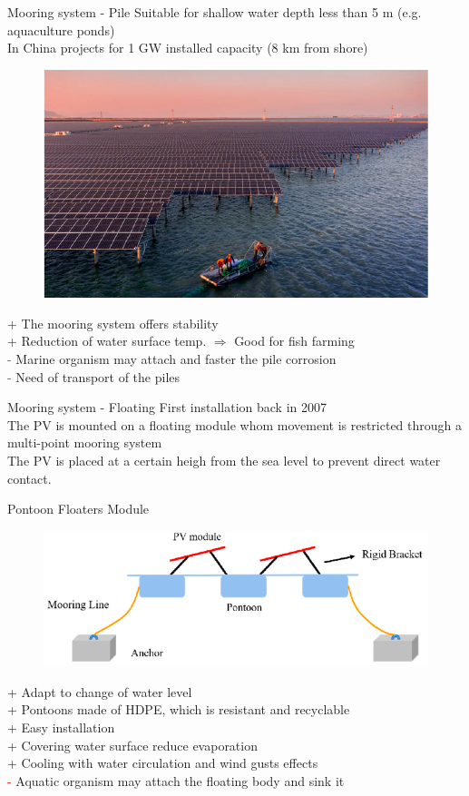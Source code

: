 \documentclass[aspectratio=169, 12pt]{beamer}
\begin{document}
\begin{frame}{Mooring system - Pile}
  Suitable for shallow water depth less than 5 m (e.g. aquaculture ponds)\\
  In China projects for 1 GW installed capacity (8 km from shore)

  \begin{figure}
    \centering
    \includegraphics[width=0.3\columnwidth]{figure/floating_PV_china.png}
  \end{figure}

  \textcolor{NTNUgreen}{+} The mooring system offers stability\\
  \textcolor{NTNUgreen}{+} Reduction of water surface temp. $\Rightarrow$ Good for fish farming\\
  \textcolor{red}{-} Marine organism may attach and faster the pile corrosion\\
  \textcolor{red}{-} Need of transport of the piles\\
\end{frame}

\begin{frame}{Mooring system - Floating}
  First installation back in 2007\\
  The PV is mounted on a floating module whom movement is restricted through a multi-point mooring system \\
  The PV is placed at a certain heigh from the sea level to prevent direct water contact.
\end{frame}

\begin{frame}{Pontoon Floaters Module}
  \begin{figure}
    \centering
    \includegraphics[width=0.3\columnwidth]{figure/pontoon.png}
  \end{figure}
  \textcolor{NTNUgreen}{+} Adapt to change of water level\\
  \textcolor{NTNUgreen}{+} Pontoons made of HDPE, which is resistant and recyclable\\
  \textcolor{NTNUgreen}{+} Easy installation\\
  \textcolor{NTNUgreen}{+} Covering water surface reduce evaporation\\
  \textcolor{NTNUgreen}{+} Cooling with water circulation and wind gusts effects\\
  \textcolor{red}{-} Aquatic organism may attach the floating body and sink it
\end{frame}
\end{document}
